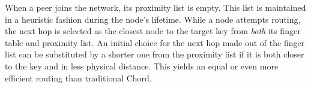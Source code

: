 When a peer joins the network, its proximity list is empty.
This list is maintained in a heuristic fashion during the node's lifetime.
While a node attempts routing, the next hop is selected
as the closest node to the target key 
from \emph{both} its finger table and proximity list. 
An initial choice for the next hop made out of the finger list 
can be substituted by a shorter one from the proximity list if  
it is both closer to the key and in less physical distance.
This yields an equal or even more efficient routing than traditional Chord.

